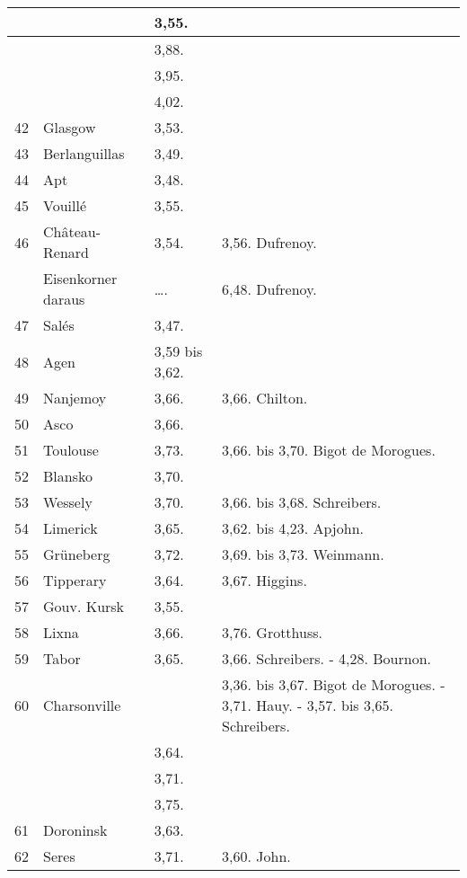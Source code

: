 \documentclass[a4paper, 11pt, oneside, polutonikogreek, german]{article}
\begin{document}
\begin{center}
\begin{longtable}{|p{7mm}|p{32mm}|p{30mm}|p{30mm}|}
          &   & 3,55. &   \\ \hline
          &   & 3,88. &   \\ \hline
          &   & 3,95. &   \\ \hline
          &   & 4,02. &   \\ \hline
        42 & Glasgow & 3,53. &   \\ \hline
        43 & Berlanguillas & 3,49. &   \\ \hline
        44 & Apt & 3,48. &   \\ \hline
        45 & Vouillé & 3,55. &   \\ \hline
        46 & Château-Renard & 3,54. & 3,56. Dufrenoy. \\ \hline
          & Eisenkorner daraus & …. & 6,48. Dufrenoy. \\ \hline
        47 & Salés & 3,47. &   \\ \hline
        48 & Agen & 3,59 bis 3,62. &   \\ \hline
        49 & Nanjemoy & 3,66. & 3,66. Chilton. \\ \hline
        50 & Asco & 3,66. &   \\ \hline
        51 & Toulouse & 3,73. & 3,66. bis 3,70. Bigot de Morogues. \\ \hline
        52 & Blansko & 3,70. &   \\ \hline
        53 & Wessely & 3,70. & 3,66. bis 3,68. Schreibers. \\ \hline
        54 & Limerick & 3,65. & 3,62. bis 4,23. Apjohn. \\ \hline
        55 & Grüneberg & 3,72. & 3,69. bis 3,73. Weinmann. \\ \hline
        56 & Tipperary & 3,64. & 3,67. Higgins. \\ \hline
        57 & Gouv. Kursk & 3,55. &   \\ \hline
        58 & Lixna & 3,66. & 3,76. Grotthuss. \\ \hline
        59 & Tabor & 3,65. & 3,66. Schreibers. - 4,28. Bournon. \\ \hline
        60 & Charsonville &   & 3,36. bis 3,67. Bigot de Morogues. - 3,71. Hauy. - 3,57. bis 3,65. Schreibers. \\ \hline
          &   & 3,64. &   \\ \hline
          &   & 3,71. &   \\ \hline
          &   & 3,75. &   \\ \hline
        61 & Doroninsk & 3,63. &   \\ \hline
        62 & Seres & 3,71. & 3,60. John. \\ \hline

\end{longtable}
\end{center}
\end{document}
